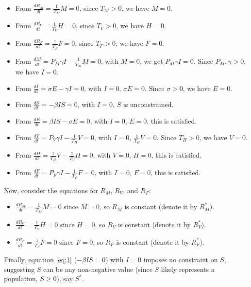\documentclass[11pt]{article}
\begin{document}
\begin{itemize}
    \item From \(\frac{dR_M}{dt} = \frac{1}{T_M} M = 0\), since \(T_M > 0\), we have \(M = 0\).
    \item From \(\frac{dR_V}{dt} = \frac{1}{T_V} H = 0\), since \(T_V > 0\), we have \(H = 0\).
    \item From \(\frac{dR_F}{dt} = \frac{1}{T_F} F = 0\), since \(T_F > 0\), we have \(F = 0\).
    \item From \(\frac{dM}{dt} = P_M \gamma I - \frac{1}{T_M} M = 0\), with \(M = 0\), we get \(P_M \gamma I = 0\). Since \(P_M, \gamma > 0\), we have \(I = 0\).
    \item From \(\frac{dI}{dt} = \sigma E - \gamma I = 0\), with \(I = 0\), \(\sigma E = 0\). Since \(\sigma > 0\), we have \(E = 0\).
    \item From \(\frac{dS}{dt} = -\beta I S = 0\), with \(I = 0\), \(S\) is unconstrained.
    \item From \(\frac{dE}{dt} = \beta I S - \sigma E = 0\), with \(I = 0\), \(E = 0\), this is satisfied.
    \item From \(\frac{dV}{dt} = P_V \gamma I - \frac{1}{T_H} V = 0\), with \(I = 0\), \(\frac{1}{T_H} V = 0\). Since \(T_H > 0\), we have \(V = 0\).
    \item From \(\frac{dH}{dt} = \frac{1}{T_H} V - \frac{1}{T_V} H = 0\), with \(V = 0\), \(H = 0\), this is satisfied.
    \item From \(\frac{dF}{dt} = P_F \gamma I - \frac{1}{T_F} F = 0\), with \(I = 0\), \(F = 0\), this is satisfied.
\end{itemize}

Now, consider the equations for $R_M$, $R_V$, and $R_F$:

\begin{itemize}
\item $\frac{dR_M}{dt} = \frac{1}{T_M} M = 0$ since $M = 0$, so $R_M$ is constant (denote it by $R_M^*$).
\item $\frac{dR_V}{dt} = \frac{1}{T_V} H = 0$ since $H = 0$, so $R_V$ is constant (denote it by $R_V^*$).
\item $\frac{dR_F}{dt} = \frac{1}{T_F} F = 0$ since $F = 0$, so $R_F$ is constant (denote it by $R_F^*$).
\end{itemize}

Finally, equation \ref{eq:1} ($-\beta I S = 0$) with $I = 0$ imposes no constraint on $S$, suggesting $S$ can be any non-negative value (since $S$ likely represents a population, $S \geq 0$), say $S^*$.
\end{document}
